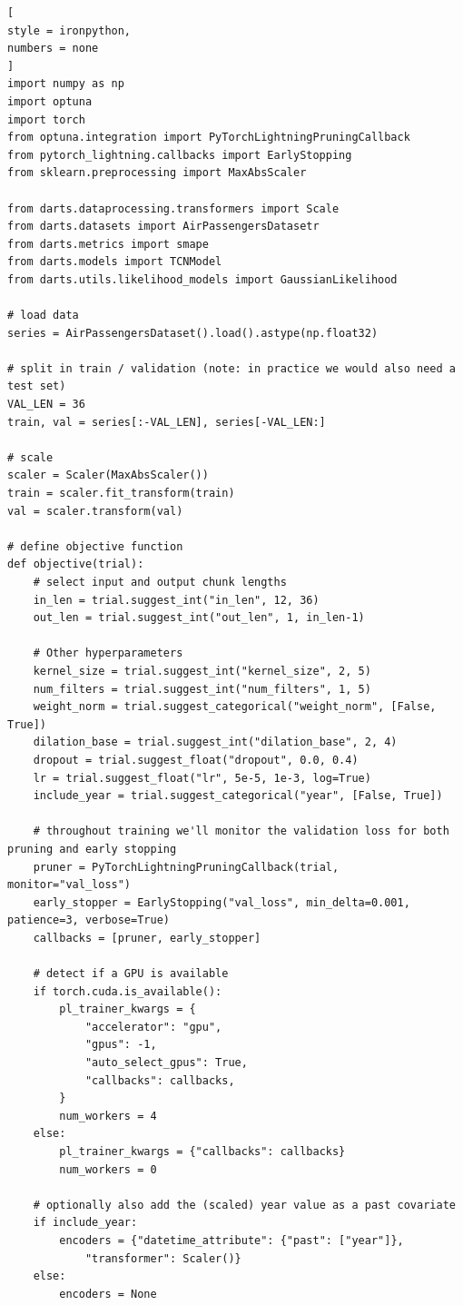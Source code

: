 \documentclass[%
	11pt,
	a4paper,
	utf8,
		]{article}
\begin{document}
\begin{lstlisting}[
style = ironpython,
numbers = none
]
import numpy as np
import optuna
import torch
from optuna.integration import PyTorchLightningPruningCallback
from pytorch_lightning.callbacks import EarlyStopping
from sklearn.preprocessing import MaxAbsScaler

from darts.dataprocessing.transformers import Scale
from darts.datasets import AirPassengersDatasetr
from darts.metrics import smape
from darts.models import TCNModel
from darts.utils.likelihood_models import GaussianLikelihood

# load data
series = AirPassengersDataset().load().astype(np.float32)

# split in train / validation (note: in practice we would also need a test set)
VAL_LEN = 36
train, val = series[:-VAL_LEN], series[-VAL_LEN:]

# scale
scaler = Scaler(MaxAbsScaler())
train = scaler.fit_transform(train)
val = scaler.transform(val)

# define objective function
def objective(trial):
	# select input and output chunk lengths
	in_len = trial.suggest_int("in_len", 12, 36)
	out_len = trial.suggest_int("out_len", 1, in_len-1)
	
	# Other hyperparameters
	kernel_size = trial.suggest_int("kernel_size", 2, 5)
	num_filters = trial.suggest_int("num_filters", 1, 5)
	weight_norm = trial.suggest_categorical("weight_norm", [False, True])
	dilation_base = trial.suggest_int("dilation_base", 2, 4)
	dropout = trial.suggest_float("dropout", 0.0, 0.4)
	lr = trial.suggest_float("lr", 5e-5, 1e-3, log=True)
	include_year = trial.suggest_categorical("year", [False, True])
	
	# throughout training we'll monitor the validation loss for both pruning and early stopping
	pruner = PyTorchLightningPruningCallback(trial, monitor="val_loss")
	early_stopper = EarlyStopping("val_loss", min_delta=0.001, patience=3, verbose=True)
	callbacks = [pruner, early_stopper]
	
	# detect if a GPU is available
	if torch.cuda.is_available():
		pl_trainer_kwargs = {
			"accelerator": "gpu",
			"gpus": -1,
			"auto_select_gpus": True,
			"callbacks": callbacks,
		}
		num_workers = 4
	else:
		pl_trainer_kwargs = {"callbacks": callbacks}
		num_workers = 0
	
	# optionally also add the (scaled) year value as a past covariate
	if include_year:
		encoders = {"datetime_attribute": {"past": ["year"]},
			"transformer": Scaler()}
	else:
		encoders = None
	

\end{lstlisting}
\end{document}

